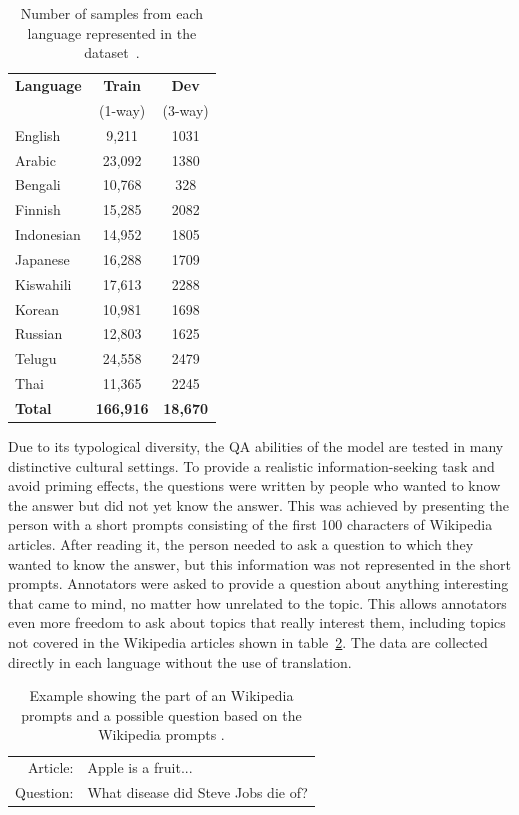 \begin{table}[h]
    \centering
    \begin{tabular}{l|c|c}
        \textbf{Language} & \textbf{Train} & \textbf{Dev} \\
         & (1-way) & (3-way) \\
        \hline 
        English & 9,211 & 1031 \\
        Arabic & 23,092 & 1380 \\
        Bengali & 10,768 & 328 \\
        Finnish & 15,285 & 2082 \\
        Indonesian & 14,952 & 1805 \\
        Japanese & 16,288 & 1709 \\
        Kiswahili & 17,613 & 2288 \\
        Korean & 10,981 & 1698 \\
        Russian & 12,803 & 1625 \\
        Telugu & 24,558 & 2479 \\
        Thai & 11,365 & 2245 \\
        \hline
        \textbf{Total} & \textbf{166,916} & \textbf{18,670} \\
    \end{tabular}
    \caption{Number of samples from each language represented in the dataset~\cite{tydiqa}.}
    \label{tab:tydiqa1}
\end{table}

Due to its typological diversity, the QA abilities of the model are tested in many distinctive cultural settings. To provide a realistic information-seeking task and avoid priming effects, the questions were written by people who wanted to know the answer but did not yet know the answer. This was achieved by presenting the person with a short prompts consisting of the first 100 characters of Wikipedia articles. After reading it, the person needed to ask a question to which they wanted to know the answer, but this information was not represented in the short prompts. Annotators were asked to provide a question about anything interesting that came to mind, no matter how unrelated to the topic. This allows annotators even more freedom to ask about topics that really interest them, including topics not covered in the Wikipedia articles shown in table~\ref{tab:tydiqa2}. The data are collected directly in each language without the use of translation.

\begin{table}[h]
    \centering
    \begin{tabular}{rl}
        \hline
        Article: & Apple is a fruit... \\
        Question: & What disease did Steve Jobs die of?\\
        \hline
    \end{tabular}
    \caption{Example showing the part of an Wikipedia prompts and a possible question based on the Wikipedia prompts \cite{tydiqa}.}
    \label{tab:tydiqa2}
\end{table}

